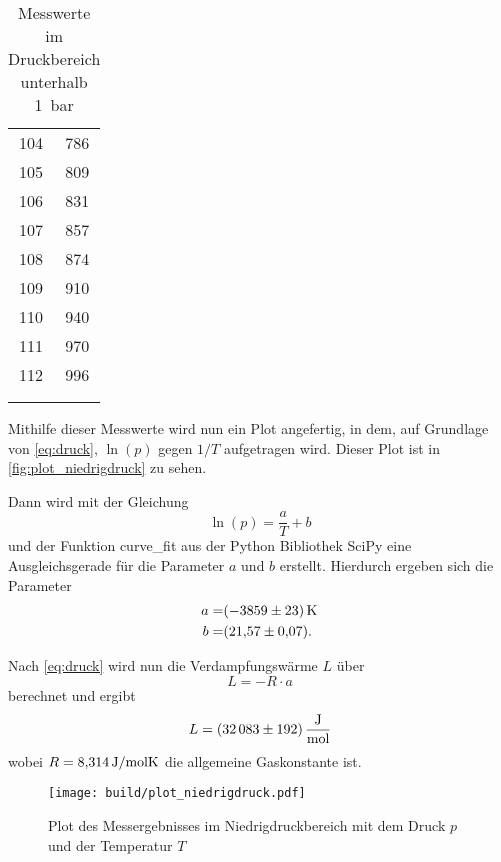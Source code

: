 \begin{table}
\begin{tabular}{S[table-format=3.0] S[table-format=3.0]}
        104 & 786 \\
        105 & 809 \\
        106 & 831 \\
        107 & 857 \\
        108 & 874 \\
        109 & 910 \\
        110 & 940 \\
        111 & 970 \\
        112 & 996 \\
        & \\
        & \\
        \bottomrule
    \end{tabular}
    \caption{Messwerte im Druckbereich unterhalb \SI{1}{bar}}
    \label{tab:niedrigdruck_messwerte}
\end{table}

Mithilfe dieser Messwerte wird nun ein Plot angefertig, in dem, auf Grundlage von \autoref{eq:druck}, $\ln(p)$ gegen $1/T$ aufgetragen wird.
Dieser Plot ist in \autoref{fig:plot_niedrigdruck} zu sehen.

Dann wird mit der Gleichung
\begin{equation}
    \ln(p) = \frac{a}{T} + b
\end{equation}
und der Funktion curve\_fit aus der Python Bibliothek SciPy eine Ausgleichsgerade für die Parameter $a$ und $b$ erstellt.\cite{scipy} Hierdurch ergeben sich die Parameter
\begin{align*}
    a =& \SI{-3859+-23}{\kelvin} \\
    b =& \SI{21.57+-0.07}{}.
    \label{eq:niedrigdruck_parameter}
\end{align*}

Nach \autoref{eq:druck} wird nun die Verdampfungswärme $L$ über
\begin{equation}
    L = -R \cdot a
\end{equation}
berechnet und ergibt
\begin{equation*}
    L = \SI{32083+-192}{\joule\per\mol}
\end{equation*}
wobei $R=\SI{8.314}{\joule\per{\mol\kelvin}}$ die allgemeine Gaskonstante ist.\cite{physics_constants}

\begin{figure}
    \centering
    \texttt{[image: build/plot\_niedrigdruck.pdf]}
    \caption{Plot des Messergebnisses im Niedrigdruckbereich mit dem Druck $p$ und der Temperatur $T$}
    \label{fig:plot_niedrigdruck}
\end{figure}

